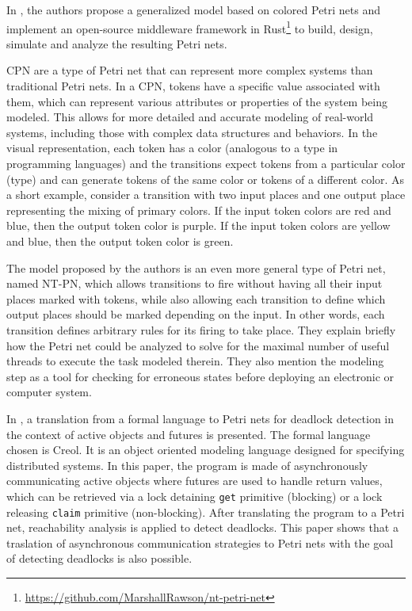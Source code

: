 \documentclass[../Thesis.tex]{subfiles}
\begin{document}
In \cite{rawson2022petri}, the authors propose a generalized model
based on colored Petri nets and implement an open-source middleware framework
in Rust\footnote{\url{https://github.com/MarshallRawson/nt-petri-net}}
to build, design, simulate and analyze the resulting Petri nets.

\acrfull{CPN} are a type of Petri net that can represent
more complex systems than traditional Petri nets.
In a CPN, tokens have a specific value associated with them,
which can represent various attributes or properties of the system being modeled.
This allows for more detailed and accurate modeling of real-world systems,
including those with complex data structures and behaviors.
In the visual representation, each token has a color
(analogous to a type in programming languages)
and the transitions expect tokens from a particular
color (type) and can generate tokens
of the same color or tokens of a different color.
As a short example, consider a transition
with two input places and one output place
representing the mixing of primary colors.
If the input token colors are red and blue, then the output token color is purple.
If the input token colors are yellow and blue, then the output token color is green.

The model proposed by the authors is an even more general type of Petri net,
named \acrfull{NT-PN}, which allows transitions to fire
without having all their input places marked with tokens,
while also allowing each transition to define
which output places should be marked depending on the input.
In other words, each transition defines arbitrary rules for its firing to take place.
They explain briefly how the Petri net could be analyzed
to solve for the maximal number of useful threads to execute the task modeled therein.
They also mention the modeling step as a tool for checking for erroneous states
before deploying an electronic or computer system.

In \cite{deboer2013petri}, a translation from a formal language to Petri nets
for deadlock detection in the context of active objects and futures is presented.
The formal language chosen is \acrfull{Creol}.
It is an object oriented modeling language designed for specifying distributed systems.
In this paper, the program is made of asynchronously communicating active objects
where futures are used to handle return values,
which can be retrieved via a lock detaining \texttt{get} primitive (blocking)
or a lock releasing \texttt{claim} primitive (non-blocking).
After translating the program to a Petri net,
reachability analysis is applied to detect deadlocks.
This paper shows that a traslation of asynchronous communication strategies
to Petri nets with the goal of detecting deadlocks is also possible.
\end{document}
